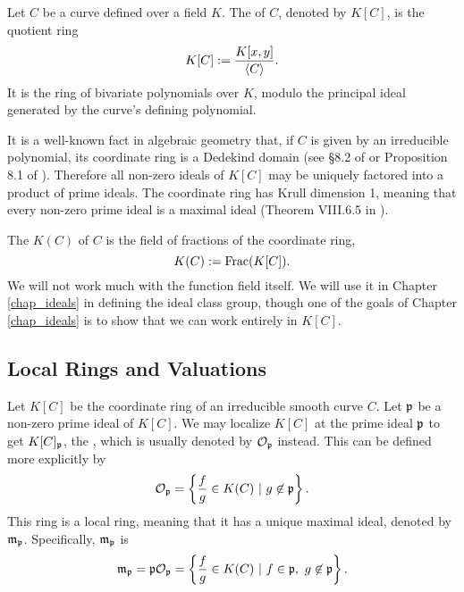 Let $C$ be a curve defined over a field $K$.
The  of $C$, denoted by $K[C]$, is the quotient ring
\[ K[C] := \frac {K[x,y]} {\pid{C}}. \]
It is the ring of bivariate polynomials over $K$,
modulo the principal ideal generated by the curve's defining polynomial.

It is a well-known fact in algebraic geometry that,
if $C$ is given by an irreducible polynomial,
its coordinate ring is a Dedekind domain (see \S 8.2 of \cite{galbraith12} or Proposition 8.1 of \cite{neukirch99}).
Therefore all non-zero ideals of $K[C]$ may be uniquely factored into a product of prime ideals.
The coordinate ring has Krull dimension 1, meaning that every non-zero prime ideal is a maximal ideal
(Theorem VIII.6.5 in \cite{hungerford}).



The  $K(C)$ of $C$ is the field of fractions of the coordinate ring,
\[ K(C) := \Frac(K[C]). \]
We will not work much with the function field itself.
We will use it in Chapter \ref{chap_ideals} in defining the ideal class group,
though one of the goals of Chapter \ref{chap_ideals} is to show that we can work entirely in $K[C]$.




\subsection{Local Rings and Valuations}
\label{sec_local_rings}

Let $K[C]$ be the coordinate ring of an irreducible smooth curve $C$.
Let $\frak p$ be a non-zero prime ideal of $K[C]$.
We may localize $K[C]$ at the prime ideal $\frak p$ to get $K[C]_{\frak p}$,
the ,
which is usually denoted by $\cal O_\frak p$ instead.
This can be defined more explicitly by
\[ \cal O_{\frak p} = \left\{ \frac f g \in K(C) ~|~ g \not \in \frak p \right\}. \]
This ring is a local ring, meaning that it has a unique maximal ideal, denoted by $\frak m_{\frak p}$.
Specifically, $\frak m_{\frak p}$ is 
\[ \frak m_{\frak p} = \frak p \cal O_{\frak p} =
   \left\{ \frac f g \in K(C) ~|~ f \in \frak p, ~g \not \in \frak p \right\}. \]

